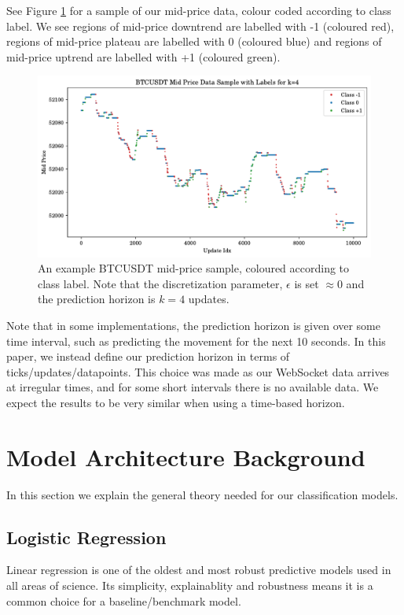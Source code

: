 See Figure \ref{fig:example_mid_price_labelling} for a sample of our mid-price data,
colour coded according to class label. We see regions of mid-price downtrend are labelled
with -1 (coloured red), regions of mid-price plateau are labelled with 0 (coloured blue)
and regions of mid-price uptrend are labelled with +1 (coloured green).

\begin{figure}[ht]
    \centering
    \includegraphics[width=1.0\textwidth]{./images/example_labels.pdf}
    \caption{An example BTCUSDT mid-price sample, coloured according to class label.
    Note that the discretization parameter, $\epsilon$ is set $\approx 0$ and the prediction horizon is $k=4$ updates.}
    \label{fig:example_mid_price_labelling}
\end{figure}


Note that in some implementations, the prediction horizon is
given over some time interval, such as predicting the movement for the next 10 seconds.
In this paper, we instead define our prediction horizon in terms of ticks/updates/datapoints.
This choice was made as our WebSocket data arrives at irregular times, and for some short intervals
there is no available data. We expect the results to be very similar when using a time-based horizon.


\section{Model Architecture Background}
In this section we explain the general theory needed for our classification models.

\subsection{Logistic Regression}
Linear regression is one of the oldest and most robust predictive models used in all areas
of science. Its simplicity, explainablity and robustness means it is a common choice for a baseline/benchmark
model.

